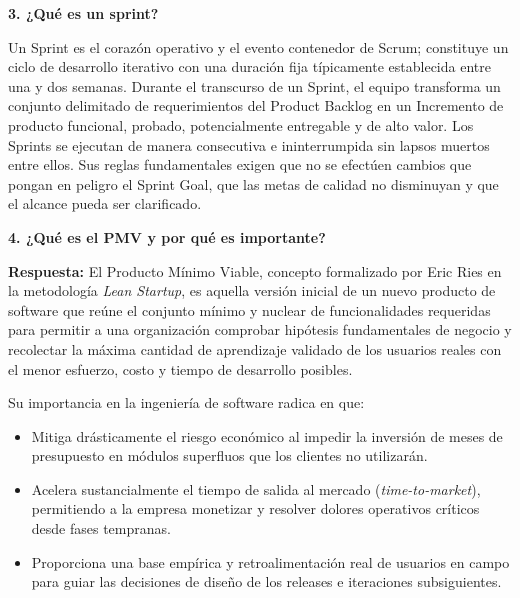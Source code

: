 \vspace{0.6em}
\noindent\textbf{\color{mauve} 3. ¿Qué es un sprint?}\par
\noindent Un Sprint es el corazón operativo y el evento contenedor de Scrum; constituye un ciclo de desarrollo iterativo con una duración fija típicamente establecida entre una y dos semanas. Durante el transcurso de un Sprint, el equipo transforma un conjunto delimitado de requerimientos del Product Backlog en un Incremento de producto funcional, probado, potencialmente entregable y de alto valor. Los Sprints se ejecutan de manera consecutiva e ininterrumpida sin lapsos muertos entre ellos. Sus reglas fundamentales exigen que no se efectúen cambios que pongan en peligro el Sprint Goal, que las metas de calidad no disminuyan y que el alcance pueda ser clarificado.

\vspace{0.6em}
\noindent\textbf{\color{mauve} 4. ¿Qué es el PMV y por qué es importante?}\par
\noindent\textbf{Respuesta:} El Producto Mínimo Viable, concepto formalizado por Eric Ries en la metodología \textit{Lean Startup}, es aquella versión inicial de un nuevo producto de software que reúne el conjunto mínimo y nuclear de funcionalidades requeridas para permitir a una organización comprobar hipótesis fundamentales de negocio y recolectar la máxima cantidad de aprendizaje validado de los usuarios reales con el menor esfuerzo, costo y tiempo de desarrollo posibles.\par
\noindent Su importancia en la ingeniería de software radica en que:
\begin{itemize}
    \item Mitiga drásticamente el riesgo económico al impedir la inversión de meses de presupuesto en módulos superfluos que los clientes no utilizarán.
    \item Acelera sustancialmente el tiempo de salida al mercado (\textit{time-to-market}), permitiendo a la empresa monetizar y resolver dolores operativos críticos desde fases tempranas.
    \item Proporciona una base empírica y retroalimentación real de usuarios en campo para guiar las decisiones de diseño de los releases e iteraciones subsiguientes.
\end{itemize}

